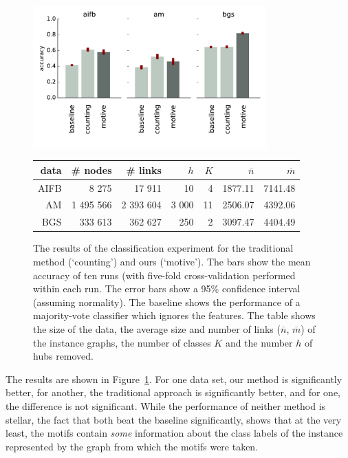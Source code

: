 \documentclass[twoside,11pt]{article}
\begin{document}
\begin{figure}[tbh]
{
  \begin{center}
  \includegraphics[width=0.8\textwidth]{./images/bars.pdf}
	\begin{tabular}{ r | r r r r r r}
		data & \# nodes & \# links & $h$ & $K$ & $\overline{n}$ & $\overline{m}$ \\
		\hline
		AIFB & 8 275 & 17 911 & 10 & 4 & 1877.11 & 7141.48 \\
		AM   & 1 495 566 & 2 393 604 & 3 000 & 11 & 2506.07 & 4392.06 \\
		BGS  & 333 613 & 362 627 & 250 & 2 & 3097.47 & 4404.49 \\
		\hline
	\end{tabular}
	\end{center}	
}

  \caption{The results of the classification experiment for the traditional method (`counting') and ours (`motive'). The bars show the mean accuracy of ten runs (with five-fold cross-validation performed within each run. The error bars show a 95\% confidence interval (assuming normality). The baseline shows the performance of a majority-vote classifier which ignores the features.  The table shows the size of the data, the average size and number of links ($\overline{n}$, $\overline{m}$) of the instance graphs, the number of classes $K$ and the number $h$ of hubs removed.}
  \label{figure:classification}
\end{figure}

The results are shown in Figure~\ref{figure:classification}. For one data set, our method is significantly better, for another, the traditional approach is significantly better, and for one, the difference is not significant. While the performance of neither method is stellar, the fact that both beat the baseline significantly, shows that at the very least, the motifs contain \emph{some} information about the class labels of the instance represented by the graph from which the motifs were taken.
 
\end{document}
